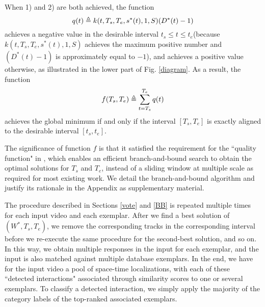 When 1) and 2) are both achieved, the function
\begin{equation}
\vspace{-5pt}
q(t)\triangleq k(t, T_{s},T_{e}, s^{*}(t), 1,S)(D^{*}(t)-1)
\label{qfunction}
\end{equation}
achieves a negative value in the desirable interval $t_{s}\le t\le t_{e}$(because $k(t, T_{s},T_{e}, s^{*}(t), 1,S)$ achieves the maximum positive number and $(D^{*}(t)-1)$ is approximately equal to $-1$), and achieves a positive value otherwise, as illustrated in the lower part of Fig. \ref{diagram}. As a result, the function
\begin{equation}
\vspace{-5pt}
\label{quality}
f(T_{s}, T_{e})\triangleq\sum^{T_{e}}_{t=T_{s}}q(t)
\end{equation}
achieves the global minimum if and only if the interval $[T_{s}, T_{e}]$ is exactly aligned to the desirable interval $[t_{s}, t_{e}]$. 

The significance of function $f$ is that it satisfied the requirement for the ``quality function"  in \cite{Lampert}, which enables an efficient branch-and-bound search to obtain the optimal solutions for $T_{s}$ and $T_{e}$, instead of a sliding window at multiple scale as required for most existing work. We detail the branch-and-bound algorithm and justify its rationale in the Appendix as supplementary material.


The procedure described in Sections \ref{vote} and \ref{BB} is repeated multiple times for each input video and each exemplar. After we find a best solution of $(W^{*}, T_{s}, T_{e})$, we remove the corresponding tracks in the corresponding interval before we re-execute the same procedure for the second-best solution, and so on. In this way, we obtain multiple responses in the input for each exemplar, and  the input is also matched against multiple database exemplars. In the end, we have for the input video a pool of space-time localizations, with each of these ``detected interactions" associated through similarity scores to one or several exemplars. To classify a detected interaction, we simply apply the majority of the category labels of the top-ranked associated exemplars.

